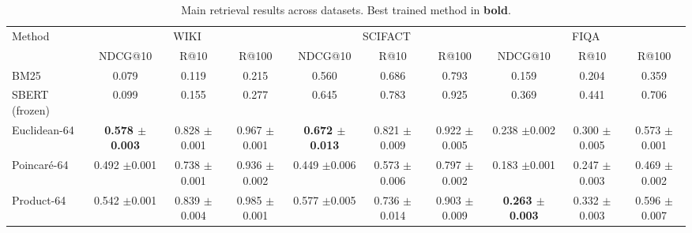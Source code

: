 \begin{table}[t]
\caption{Main retrieval results across datasets. Best trained method in \textbf{bold}.}
\label{tab:main_results}
\centering
\small
\begin{tabular}{lccccccccc}
\toprule
Method & \multicolumn{3}{c}{WIKI} & \multicolumn{3}{c}{SCIFACT} & \multicolumn{3}{c}{FIQA} \\
 & NDCG@10 & R@10 & R@100 & NDCG@10 & R@10 & R@100 & NDCG@10 & R@10 & R@100 \\
\midrule
BM25 & 0.079 & 0.119 & 0.215 & 0.560 & 0.686 & 0.793 & 0.159 & 0.204 & 0.359 \\
SBERT (frozen) & 0.099 & 0.155 & 0.277 & 0.645 & 0.783 & 0.925 & 0.369 & 0.441 & 0.706 \\
Euclidean-64 & \textbf{0.578 {\scriptsize$\pm$0.003}} & 0.828 {\scriptsize$\pm$0.001} & 0.967 {\scriptsize$\pm$0.001} & \textbf{0.672 {\scriptsize$\pm$0.013}} & 0.821 {\scriptsize$\pm$0.009} & 0.922 {\scriptsize$\pm$0.005} & 0.238 {\scriptsize$\pm$0.002} & 0.300 {\scriptsize$\pm$0.005} & 0.573 {\scriptsize$\pm$0.001} \\
Poincar\'e-64 & 0.492 {\scriptsize$\pm$0.001} & 0.738 {\scriptsize$\pm$0.001} & 0.936 {\scriptsize$\pm$0.002} & 0.449 {\scriptsize$\pm$0.006} & 0.573 {\scriptsize$\pm$0.006} & 0.797 {\scriptsize$\pm$0.002} & 0.183 {\scriptsize$\pm$0.001} & 0.247 {\scriptsize$\pm$0.003} & 0.469 {\scriptsize$\pm$0.002} \\
Product-64 & 0.542 {\scriptsize$\pm$0.001} & 0.839 {\scriptsize$\pm$0.004} & 0.985 {\scriptsize$\pm$0.001} & 0.577 {\scriptsize$\pm$0.005} & 0.736 {\scriptsize$\pm$0.014} & 0.903 {\scriptsize$\pm$0.009} & \textbf{0.263 {\scriptsize$\pm$0.003}} & 0.332 {\scriptsize$\pm$0.003} & 0.596 {\scriptsize$\pm$0.007} \\
\bottomrule
\end{tabular}
\end{table}